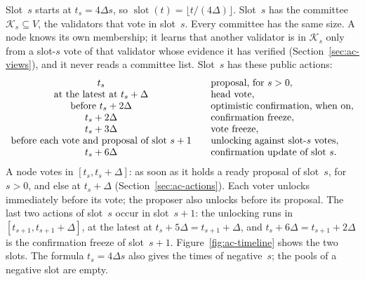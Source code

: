 \documentclass{article}
\newcommand{\slot}{\operatorname{slot}}
\newcommand{\committee}{\mathcal K}
\begin{document}
Slot~$s$ starts at $t_s=4\Delta s$, so $\slot(t)=\lfloor t/(4\Delta)\rfloor$.
Slot~$s$ has the committee $\committee_s\subseteq V$, the validators that
vote in slot~$s$.  Every committee has the same size.  A node knows its own
membership; it learns that another validator is in $\committee_s$ only from
a slot-$s$ vote of that validator whose evidence it has verified
(Section~\ref{sec:ac-views}), and it never reads a committee list.  Slot~$s$ has these public
actions:
\[
\begin{array}{c@{\qquad}l}
 t_s             & \text{proposal, for $s>0$},\\
 \text{at the latest at }t_s+\Delta & \text{head vote},\\
 \text{before }t_s+2\Delta & \text{optimistic confirmation, when on},\\
 t_s+2\Delta     & \text{confirmation freeze},\\
 t_s+3\Delta     & \text{vote freeze},\\
 \text{before each vote and proposal of slot $s+1$} & \text{unlocking against slot-$s$ votes},\\
 t_s+6\Delta     & \text{confirmation update of slot $s$}.
\end{array}
\]
A node votes in $[t_s,t_s+\Delta]$: as soon as it holds a ready proposal
of slot~$s$, for $s>0$, and else at
$t_s+\Delta$ (Section~\ref{sec:ac-actions}).  Each voter unlocks
immediately before its vote; the proposer also unlocks before its
proposal.  The last two actions of slot~$s$ occur in
slot~$s+1$: the unlocking runs in $[t_{s+1},t_{s+1}+\Delta]$, at the latest
at $t_s+5\Delta=t_{s+1}+\Delta$, and $t_s+6\Delta=t_{s+1}+2\Delta$ is the
confirmation freeze of slot~$s+1$.
Figure~\ref{fig:ac-timeline} shows the two slots.  The formula
$t_s=4\Delta s$ also gives the times of negative~$s$; the pools of a
negative slot are empty.
\end{document}
